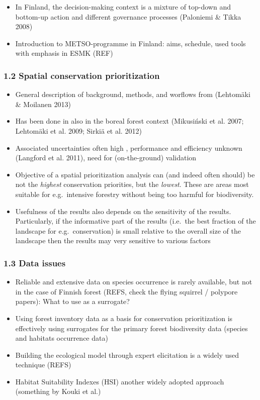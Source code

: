 \documentclass[]{article}
\begin{document}
\begin{itemize}
  \begin{itemize}
  \itemsep1pt\parskip0pt
  \item
    In Finland, the decision-making context is a mixture of top-down and
    bottom-up action and different governance processes (Paloniemi \&
    Tikka 2008)
  \item
    Introduction to METSO-programme in Finland: aims, schedule, used
    tools with emphasis in ESMK (REF)
  \end{itemize}
\end{itemize}

\subsubsection{1.2 Spatial conservation prioritization}

\begin{itemize}
\item
  General description of background, methods, and worflows from
  (Lehtomäki \& Moilanen 2013)
\item
  Has been done in also in the boreal forest context (Mikusiński et al.
  2007; Lehtomäki et al. 2009; Sirkiä et al. 2012)⁠
\item
  Associated uncertainties often high , performance and efficiency
  unknown (Langford et al. 2011), need for (on-the-ground) validation
\item
  Objective of a spatial prioritization analysis can (and indeed often
  should) be not the \emph{highest} conservation priorities, but the
  \emph{lowest}. These are areas most suitable for e.g.~intensive
  forestry without being too harmful for biodiversity.
\item
  Usefulness of the results also depends on the sensitivity of the
  results. Particularly, if the informative part of the results
  (i.e.~the best fraction of the landscape for e.g.~conservation) is
  small relative to the overall size of the landscape then the results
  may very sensitive to various factors
\end{itemize}

\subsubsection{1.3 Data issues}

\begin{itemize}
\item
  Reliable and extensive data on species occurrence is rarely available,
  but not in the case of Finnish forest (REFS, check the flying squirrel
  / polypore papers): What to use as a surrogate?
\item
  Using forest inventory data as a basis for conservation prioritization
  is effectively using surrogates for the primary forest biodiversity
  data (species and habitats occurrence data)
\item
  Building the ecological model through expert elicitation is a widely
  used technique (REFS)
\item
  Habitat Suitability Indexes (HSI) another widely adopted approach
  (something by Kouki et al.)
\end{itemize}
\end{document}
